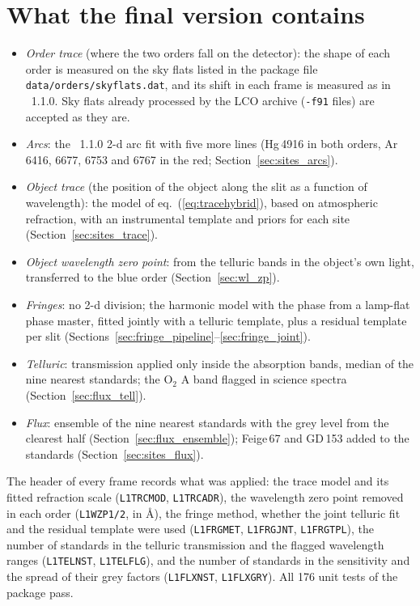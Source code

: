 \section{What the final version contains}
\label{sec:sites_final}
\begin{itemize}
\item \textit{Order trace} (where the two orders fall on the detector): the shape of each order is measured on the
sky flats listed in the package file \texttt{data/orders/skyflats.dat}, and its shift in each frame is measured as in
\banzai{}~1.1.0. Sky flats already processed by the LCO archive (\texttt{-f91} files) are accepted as they are.
\item \textit{Arcs}: the \banzai{}~1.1.0 2-d arc fit with five more lines (Hg\,4916 in both orders, Ar\,6416, 6677,
6753 and 6767 in the red; Section~\ref{sec:sites_arcs}).
\item \textit{Object trace} (the position of the object along the slit as a function of wavelength): the model of
eq.~(\ref{eq:tracehybrid}), based on atmospheric refraction, with an instrumental template and priors for each site
(Section~\ref{sec:sites_trace}).
\item \textit{Object wavelength zero point}: from the telluric bands in the object's own light, transferred to the
blue order (Section~\ref{sec:wl_zp}).
\item \textit{Fringes}: no 2-d division; the harmonic model with the phase from a lamp-flat phase master, fitted jointly
with a telluric template, plus a residual template per slit (Sections~\ref{sec:fringe_pipeline}--\ref{sec:fringe_joint}).
\item \textit{Telluric}: transmission applied only inside the absorption bands, median of the nine nearest standards;
the O$_2$ A band flagged in science spectra (Section~\ref{sec:flux_tell}).
\item \textit{Flux}: ensemble of the nine nearest standards with the grey level from the clearest half
(Section~\ref{sec:flux_ensemble}); Feige\,67 and GD\,153 added to the standards (Section~\ref{sec:sites_flux}).
\end{itemize}
The header of every frame records what was applied: the trace model and its fitted refraction scale
(\texttt{L1TRCMOD}, \texttt{L1TRCADR}), the wavelength zero point removed in each order (\texttt{L1WZP1/2}, in
\AA), the fringe method, whether the joint telluric fit and the residual template were used (\texttt{L1FRGMET},
\texttt{L1FRGJNT}, \texttt{L1FRGTPL}), the number of standards in the telluric transmission and the flagged
wavelength ranges (\texttt{L1TELNST}, \texttt{L1TELFLG}), and the number of standards in the sensitivity and the spread
of their grey factors (\texttt{L1FLXNST}, \texttt{L1FLXGRY}). All 176 unit tests of the package pass.

